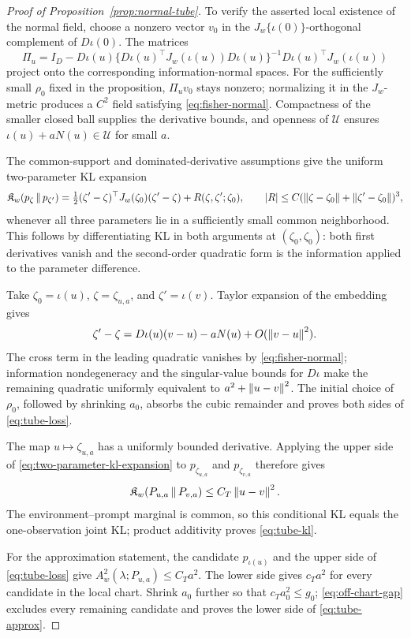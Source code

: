 \begin{proof}[Proof of Proposition~\ref{prop:normal-tube}]
To verify the asserted local existence of the normal field, choose a nonzero
vector \(v_0\) in the \(J_w\{\iota(0)\}\)-orthogonal complement of
\(D\iota(0)\). The matrices
\[
\Pi_u=I_D-D\iota(u)
\{D\iota(u)^\top J_w(\iota(u))D\iota(u)\}^{-1}
D\iota(u)^\top J_w(\iota(u))
\]
project onto the corresponding information-normal spaces. For the sufficiently
small \(\rho_0\) fixed in the proposition, \(\Pi_uv_0\) stays nonzero;
normalizing it in the \(J_w\)-metric
produces a \(C^2\) field satisfying \cref{eq:fisher-normal}. Compactness of
the smaller closed ball supplies the derivative bounds, and openness of
\(\mathcal U\) ensures \(\iota(u)+aN(u)\in\mathcal U\) for small \(a\).

The common-support and dominated-derivative assumptions give the uniform
two-parameter KL expansion
\begin{equation}
\mathfrak K_w\!\left(p_\zeta\,\middle\|\,p_{\zeta'}\right)
=\tfrac12(\zeta'-\zeta)^\top
J_w(\zeta_0)(\zeta'-\zeta)
+R(\zeta,\zeta';\zeta_0),
\qquad
|R|\le C(\left\lVert \zeta-\zeta_0\right\rVert+\left\lVert \zeta'-\zeta_0\right\rVert)^3,
\label{eq:two-parameter-kl-expansion}
\end{equation}
whenever all three parameters lie in a sufficiently small common
neighborhood. This follows by differentiating KL in both arguments at
\((\zeta_0,\zeta_0)\): both first derivatives vanish and the second-order
quadratic form is the information applied to the parameter difference.

Take \(\zeta_0=\iota(u)\), \(\zeta=\zeta_{u,a}\), and
\(\zeta'=\iota(v)\). Taylor expansion of the embedding gives
\[
\zeta'-\zeta
=D\iota(u)(v-u)-aN(u)+O(\left\lVert v-u\right\rVert^2).
\]
The cross term in the leading quadratic vanishes by
\cref{eq:fisher-normal}; information nondegeneracy and the singular-value
bounds for \(D\iota\) make the remaining quadratic uniformly equivalent to
\(a^2+\left\lVert u-v\right\rVert^2\). The initial choice of \(\rho_0\), followed by shrinking
\(a_0\), absorbs the cubic
remainder and proves both sides of \cref{eq:tube-loss}.

The map \(u\mapsto\zeta_{u,a}\) has a uniformly bounded derivative. Applying
the upper side of \cref{eq:two-parameter-kl-expansion} to
\(p_{\zeta_{u,a}}\) and \(p_{\zeta_{v,a}}\) therefore gives
\[
\mathfrak K_w\!\left(P_{u,a}\,\middle\|\,P_{v,a}\right)\le C_T\left\lVert u-v\right\rVert^2.
\]
The environment--prompt marginal is common, so this conditional KL equals
the one-observation joint KL; product additivity proves
\cref{eq:tube-kl}.

For the approximation statement, the candidate \(p_{\iota(u)}\) and the
upper side of \cref{eq:tube-loss} give
\(A_w^2(\lambda;P_{u,a})\le C_Ta^2\). The lower side gives
\(c_Ta^2\) for every candidate in the local chart. Shrink \(a_0\) further so
that \(c_Ta_0^2\le g_0\);
\cref{eq:off-chart-gap} excludes every remaining candidate and proves the
lower side of \cref{eq:tube-approx}.
\end{proof}

